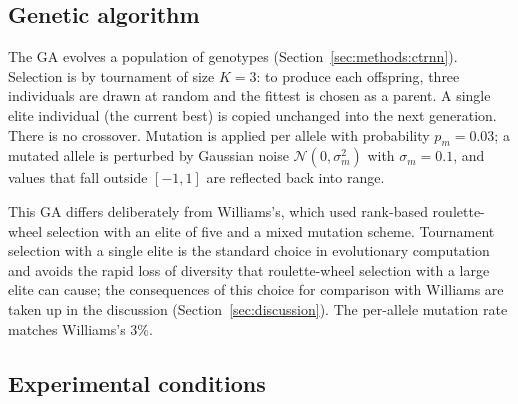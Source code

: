 \subsection{Genetic algorithm}
\label{sec:methods:ga}

The GA evolves a population of genotypes
(Section~\ref{sec:methods:ctrnn}). Selection is by tournament of size $K = 3$:
to produce each offspring, three individuals are drawn at random and the fittest
is chosen as a parent. A single elite individual (the current best) is copied
unchanged into the next generation. There is no crossover. Mutation is applied
per allele with probability $p_m = 0.03$; a mutated allele is perturbed by
Gaussian noise $\mathcal{N}(0, \sigma_m^2)$ with $\sigma_m = 0.1$, and values
that fall outside $[-1, 1]$ are reflected back into range.

This GA differs deliberately from Williams's, which used rank-based
roulette-wheel selection with an elite of five and a mixed mutation scheme.
Tournament selection with a single elite is the standard choice in evolutionary
computation and avoids the rapid loss of diversity that roulette-wheel selection
with a large elite can cause; the consequences of this choice for comparison
with Williams are taken up in the discussion
(Section~\ref{sec:discussion}). The per-allele mutation rate matches Williams's
$3\%$.


\subsection{Experimental conditions}
\label{sec:methods:conditions}

